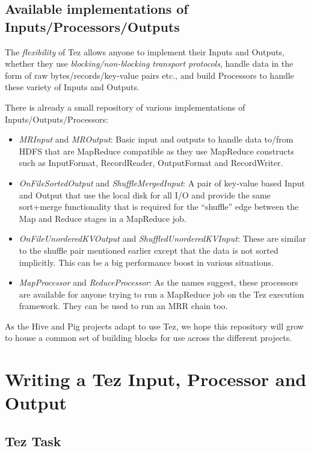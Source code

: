 \documentclass[twocolumn]{article}
\begin{document}
\subsection{Available implementations of Inputs/Processors/Outputs}

The \emph{flexibility} of Tez allows anyone to implement their Inputs
and Outputs, whether they use \emph{blocking/non-blocking transport
protocols}, handle data in the form of raw bytes/records/key-value pairs
etc., and build Processors to handle these variety of Inputs and
Outputs.

There is already a small repository of various implementations of
Inputs/Outputs/Processors:

\begin{itemize}

\item
  \emph{MRInput} and \emph{MROutput}: Basic input and outputs to
  handle data to/from HDFS that are MapReduce compatible as they use
  MapReduce constructs such as InputFormat, RecordReader, OutputFormat
  and RecordWriter.
\item
  \emph{OnFileSortedOutput} and \emph{ShuffleMergedInput}: A pair of  key-value based Input and Output that use the local disk for all I/O
  and provide the same sort+merge functionality that is required for the
  ``shuffle'' edge between the Map and Reduce stages in a MapReduce job.
\item
  \emph{OnFileUnorderedKVOutput} and
  \emph{ShuffledUnorderedKVInput}: These are similar to the shuffle
  pair mentioned earlier except that the data is not sorted implicitly.
  This can be a big performance boost in various situations.
\item
  \emph{MapProcessor} and \emph{ReduceProcessor}: As the names
  suggest, these processors are available for anyone trying to run a
  MapReduce job on the Tez execution framework. They can be used to run
  an MRR chain too.
\end{itemize}

As the Hive and Pig projects adapt to use Tez, we hope this repository
will grow to house a common set of building blocks for use across the
different projects.

\section{Writing a Tez Input, Processor and Output}
\subsection{Tez Task}
\end{document}
